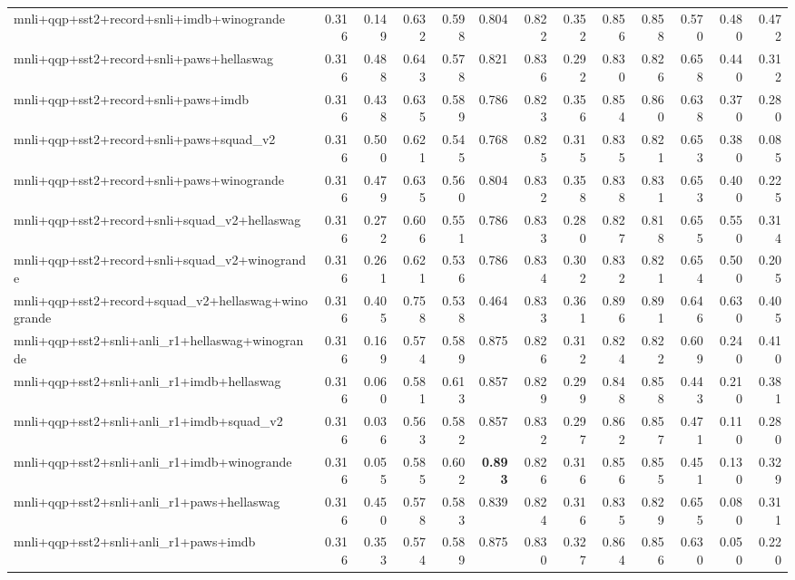 \begin{table}[t]
\begin{tabular}{lrrrrrrrrrrrr}
    mnli+qqp+sst2+record+snli+imdb+winogrande & 0.316 & 0.149 & 0.632 & 0.598 & 0.804 & 0.822 & 0.352 & 0.856 & 0.858 & 0.570 & 0.480 & 0.472 \\
    mnli+qqp+sst2+record+snli+paws+hellaswag & 0.316 & 0.488 & 0.643 & 0.578 & 0.821 & 0.836 & 0.292 & 0.830 & 0.826 & 0.658 & 0.440 & 0.312 \\
    mnli+qqp+sst2+record+snli+paws+imdb & 0.316 & 0.438 & 0.635 & 0.589 & 0.786 & 0.823 & 0.356 & 0.854 & 0.860 & 0.638 & 0.370 & 0.280 \\
    mnli+qqp+sst2+record+snli+paws+squad\_v2 & 0.316 & 0.500 & 0.621 & 0.545 & 0.768 & 0.825 & 0.315 & 0.835 & 0.821 & 0.653 & 0.380 & 0.085 \\
    mnli+qqp+sst2+record+snli+paws+winogrande & 0.316 & 0.479 & 0.635 & 0.560 & 0.804 & 0.832 & 0.358 & 0.838 & 0.831 & 0.653 & 0.400 & 0.225 \\
    mnli+qqp+sst2+record+snli+squad\_v2+hellaswag & 0.316 & 0.272 & 0.606 & 0.551 & 0.786 & 0.833 & 0.280 & 0.827 & 0.818 & 0.655 & 0.550 & 0.314 \\
    mnli+qqp+sst2+record+snli+squad\_v2+winogrande & 0.316 & 0.261 & 0.621 & 0.536 & 0.786 & 0.834 & 0.302 & 0.832 & 0.821 & 0.654 & 0.500 & 0.205 \\
    mnli+qqp+sst2+record+squad\_v2+hellaswag+winogrande & 0.316 & 0.405 & 0.758 & 0.538 & 0.464 & 0.833 & 0.361 & 0.896 & 0.891 & 0.646 & 0.630 & 0.405 \\
    mnli+qqp+sst2+snli+anli\_r1+hellaswag+winogrande & 0.316 & 0.169 & 0.574 & 0.589 & 0.875 & 0.826 & 0.312 & 0.824 & 0.822 & 0.609 & 0.240 & 0.410 \\
    mnli+qqp+sst2+snli+anli\_r1+imdb+hellaswag & 0.316 & 0.060 & 0.581 & 0.613 & 0.857 & 0.829 & 0.299 & 0.848 & 0.858 & 0.443 & 0.210 & 0.381 \\
    mnli+qqp+sst2+snli+anli\_r1+imdb+squad\_v2 & 0.316 & 0.036 & 0.563 & 0.582 & 0.857 & 0.832 & 0.297 & 0.862 & 0.857 & 0.471 & 0.110 & 0.280 \\
    mnli+qqp+sst2+snli+anli\_r1+imdb+winogrande & 0.316 & 0.055 & 0.585 & 0.602 & \textbf{0.893} & 0.826 & 0.316 & 0.856 & 0.855 & 0.451 & 0.130 & 0.329 \\
    mnli+qqp+sst2+snli+anli\_r1+paws+hellaswag & 0.316 & 0.450 & 0.578 & 0.583 & 0.839 & 0.824 & 0.316 & 0.835 & 0.829 & 0.655 & 0.080 & 0.311 \\
    mnli+qqp+sst2+snli+anli\_r1+paws+imdb & 0.316 & 0.353 & 0.574 & 0.589 & 0.875 & 0.830 & 0.327 & 0.864 & 0.856 & 0.630 & 0.050 & 0.220 \\

\end{tabular}
\end{table}
